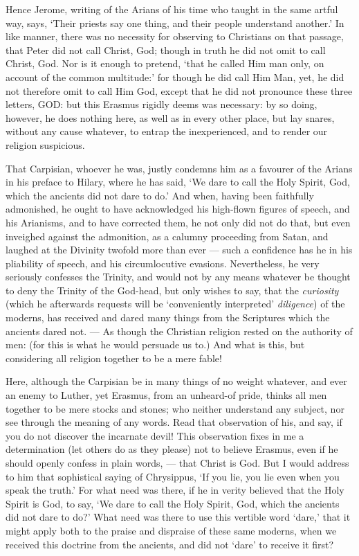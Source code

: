 Hence Jerome, writing of the Arians of his time who taught in the same artful way, says, ‘Their priests say one thing, and their people understand another.’ In like manner, there was no necessity for observing to Christians on that passage, that Peter did not call Christ, God; though in truth he did not omit to call Christ, God. Nor is it enough to pretend, ‘that he called Him man only, on account of the common multitude:’ for though he did call Him Man, yet, he did not therefore omit to call Him God, except that he did not pronounce these three letters, \textsc{GOD}: but this Erasmus rigidly deems was necessary: by so doing, however, he does nothing here, as well as in every other place, but lay snares, without any cause whatever, to entrap the inexperienced, and to render our religion suspicious.

That Carpisian, whoever he was, justly condemns him as a favourer of the Arians in his preface to Hilary, where he has said, ‘We dare to call the Holy Spirit, God, which the ancients did not dare to do.’ And when, having been faithfully admonished, he ought to have acknowledged his high-flown figures of speech, and his Arianisms, and to have corrected them, he not only did not do that, but even inveighed against the admonition, as a calumny proceeding from Satan, and laughed at the Divinity twofold more than ever — such a confidence has he in his pliability of speech, and his circumlocutive evasions. Nevertheless, he very seriously confesses the Trinity, and would not by any means whatever be thought to deny the Trinity of the God-head, but only wishes to say, that the \emph{curiosity }(which he afterwards requests will be ‘conveniently interpreted’ \emph{diligence}) of the moderns, has received and dared many things from the Scriptures which the ancients dared not. — As though the Christian religion rested on the authority of men: (for this is what he would persuade us to.) And what is this, but considering all religion together to be a mere fable!

Here, although the Carpisian be in many things of no weight whatever, and ever an enemy to Luther, yet Erasmus, from an unheard-of pride, thinks all men together to be mere stocks and stones; who neither understand any subject, nor see through the meaning of any words. Read that observation of his, and say, if you do not discover the incarnate devil! This observation fixes in me a determination (let others do as they please) not to believe Erasmus, even if he should openly confess in plain words, — that Christ is God. But I would address to him that sophistical saying of Chrysippus, ‘If you lie, you lie even when you speak the truth.’ For what need was there, if he in verity believed that the Holy Spirit is God, to say, ‘We dare to call the Holy Spirit, God, which the ancients did not dare to do?’ What need was there to use this vertible word ‘dare,’ that it might apply both to the praise and dispraise of these same moderns, when we received this doctrine from the ancients, and did not ‘dare’ to receive it first?

